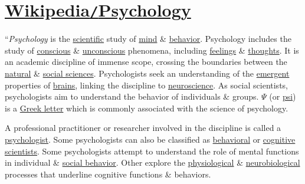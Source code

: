 \documentclass[oneside]{book}
\numberwithin{equation}{section}
\begin{document}

\section{\href{https://en.wikipedia.org/wiki/Psychology}{Wikipedia\texttt{/}Psychology}}
``\textit{Psychology} is the \href{https://en.wikipedia.org/wiki/Science}{scientific} study of \href{https://en.wikipedia.org/wiki/Mind}{mind} \& \href{https://en.wikipedia.org/wiki/Behavior}{behavior}. Psychology includes the study of \href{https://en.wikipedia.org/wiki/Consciousness}{conscious} \& \href{https://en.wikipedia.org/wiki/Unconscious_mind}{unconscious} phenomena, including \href{https://en.wikipedia.org/wiki/Feeling}{feelings} \& \href{https://en.wikipedia.org/wiki/Thought}{thoughts}. It is an academic discipline of immense scope, crossing the boundaries between the \href{https://en.wikipedia.org/wiki/Natural_science}{natural} \& \href{https://en.wikipedia.org/wiki/Social_science}{social sciences}. Psychologists seek an understanding of the \href{https://en.wikipedia.org/wiki/Emergence}{emergent} properties of \href{https://en.wikipedia.org/wiki/Brain}{brains}, linking the discipline to \href{https://en.wikipedia.org/wiki/Neuroscience}{neuroscience}. As social scientists, psychologists aim to understand the behavior of individuals \& groups. $\Psi$ (or \href{https://en.wikipedia.org/wiki/Psi_(Greek)}{psi}) is a \href{https://en.wikipedia.org/wiki/Greek_alphabet}{Greek letter} which is commonly associated with the science of psychology.

A professional practitioner or researcher involved in the discipline is called a \href{https://en.wikipedia.org/wiki/Psychologist}{psychologist}. Some psychologists can also be classified as \href{https://en.wikipedia.org/wiki/Behavioural_sciences}{behavioral} or \href{https://en.wikipedia.org/wiki/Cognitive_science}{cognitive scientists}. Some psychologists attempt to understand the role of mental functions in individual \& \href{https://en.wikipedia.org/wiki/Social_behavior}{social behavior}. Other explore the \href{https://en.wikipedia.org/wiki/Physiology}{physiological} \& \href{https://en.wikipedia.org/wiki/Nervous_system}{neurobiological} processes that underline cognitive functions \& behaviors.
\end{document}
